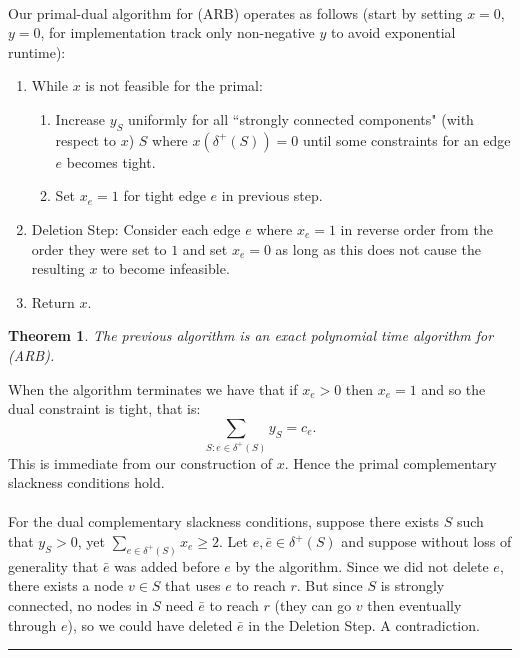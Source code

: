 \documentclass[letterpaper,12pt,oneside,onecolumn]{article}
\newenvironment{proof}{{\bf Proof:  }}{\hfill\rule{2mm}{2mm}}
\newtheorem{theorem}[fact]{Theorem}
\begin{document}
\paragraph{}
Our primal-dual algorithm for (ARB) operates as follows (start by setting $x=0$, $y=0$, for implementation track only non-negative $y$ to avoid exponential runtime): 
\begin{enumerate}
\item While $x$ is not feasible for the primal:
	\begin{enumerate}
	\item Increase $y_S$ uniformly for all ``strongly connected components" (with respect to $x$) $S$ where $x(\delta^+(S)) = 0$ until some constraints for an edge $e$ becomes tight.
	\item Set $x_e=1$ for tight edge $e$ in previous step.
	\end{enumerate}
\item Deletion Step: Consider each edge $e$ where $x_e = 1$ in reverse order from the order they were set to $1$ and set $x_e = 0$ as long as this does not cause the resulting $x$ to become infeasible.
\item Return $x$.
\end{enumerate}
\begin{theorem}
The previous algorithm is an exact polynomial time algorithm for (ARB).
\end{theorem}
\begin{proof}
When the algorithm terminates we have that if $x_e > 0$ then $x_e = 1$  and so the dual constraint is tight, that is:
$$\sum_{S : e\in\delta^+(S)} y_S = c_e.$$
This is immediate from our construction of $x$. Hence the primal complementary slackness conditions hold.
\paragraph{}
For the dual complementary slackness conditions, suppose there exists $S$ such that $y_S > 0$, yet $\sum_{e\in \delta^+(S)} x_e \geq 2$. Let $e, \bar{e} \in \delta^+(S)$ and suppose without loss of generality that $\bar{e}$ was added before $e$ by the algorithm. Since we did not delete $e$, there exists a node $v \in S$ that uses $e$ to reach $r$. But since $S$ is strongly connected, no nodes in $S$ need $\bar{e}$ to reach $r$ (they can go $v$ then eventually through $e$), so we could have deleted $\bar{e}$ in the Deletion Step. A contradiction.
\end{proof}
\end{document}
